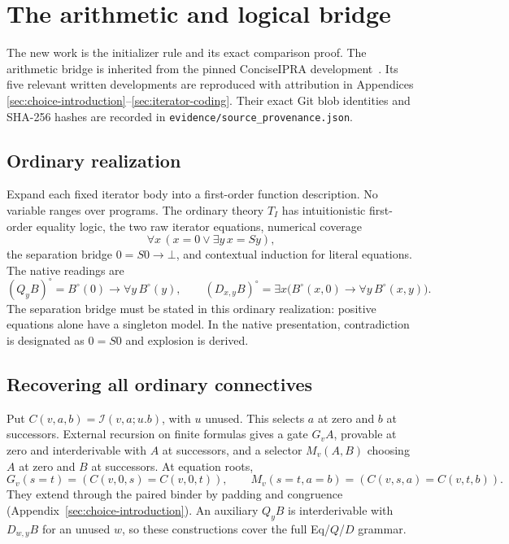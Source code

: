 \documentclass[11pt,a4paper]{article}
\theoremstyle{definition}
\begin{document}



\section{The arithmetic and logical bridge}
\label{sec:bridge-summary}

The new work is the initializer rule and its exact comparison proof.
The arithmetic bridge is inherited from the pinned ConciseIPRA
development~\cite{upstream}. Its five relevant written developments
are reproduced with attribution in Appendices
\ref{sec:choice-introduction}--\ref{sec:iterator-coding}.
Their exact Git blob identities and SHA-256 hashes are recorded in
\texttt{evidence/source\_provenance.json}.

\subsection{Ordinary realization}

Expand each fixed iterator body into a first-order function description.
No variable ranges over programs. The ordinary theory \(T_I\) has
intuitionistic first-order equality logic, the two raw iterator equations,
numerical coverage
\[
 \forall x\,(x=0\vee\exists y\,x=Sy),
\]
the separation bridge \(0=S0\to\bot\), and contextual induction for
literal equations. The native readings are
\[
 (Q_yB)^\circ=B^\circ(0)\to\forall y\,B^\circ(y),\qquad
 (D_{x,y}B)^\circ=
 \exists x\bigl(B^\circ(x,0)\to\forall y\,B^\circ(x,y)\bigr).
\]
The separation bridge must be stated in this ordinary realization:
positive equations alone have a singleton model. In the native
presentation, contradiction is designated as \(0=S0\) and explosion
is derived.

\subsection{Recovering all ordinary connectives}

Put \(C(v,a,b)=\mathcal I(v,a;u.b)\), with \(u\) unused. This selects
\(a\) at zero and \(b\) at successors. External recursion on finite
formulas gives a gate \(G_vA\), provable at zero and interderivable
with \(A\) at successors, and a selector \(M_v(A,B)\) choosing \(A\)
at zero and \(B\) at successors. At equation roots,
\[
 G_v(s=t)=(C(v,0,s)=C(v,0,t)),\qquad
 M_v(s=t,a=b)=(C(v,s,a)=C(v,t,b)).
\]
They extend through the paired binder by padding and congruence
(Appendix~\ref{sec:choice-introduction}). An auxiliary \(Q_yB\)
is interderivable with \(D_{w,y}B\) for an unused \(w\), so these
constructions cover the full Eq/\(Q\)/\(D\) grammar.
\end{document}
